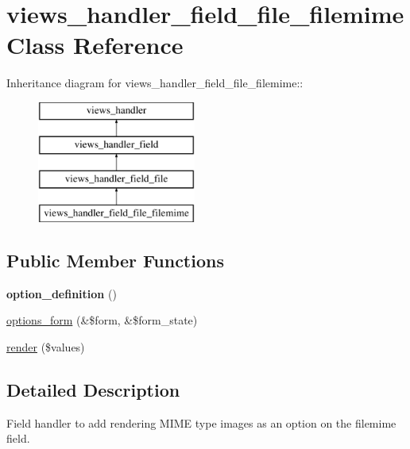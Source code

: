 \hypertarget{classviews__handler__field__file__filemime}{
\section{views\_\-handler\_\-field\_\-file\_\-filemime Class Reference}
\label{classviews__handler__field__file__filemime}
}
Inheritance diagram for views\_\-handler\_\-field\_\-file\_\-filemime::\begin{figure}[H]
\begin{center}
\leavevmode
\includegraphics[height=4cm]{classviews__handler__field__file__filemime}
\end{center}
\end{figure}
\subsection*{Public Member Functions}
\begin{DoxyCompactItemize}
\item 
\hypertarget{classviews__handler__field__file__filemime_ae6e7c1da2de1fdc2f2306578cf56d426}{
{\bfseries option\_\-definition} ()}
\label{classviews__handler__field__file__filemime_ae6e7c1da2de1fdc2f2306578cf56d426}

\item 
\hyperlink{classviews__handler__field__file__filemime_a0ca50231798333edb2dbe1a53d560b8f}{options\_\-form} (\&\$form, \&\$form\_\-state)
\item 
\hyperlink{classviews__handler__field__file__filemime_aab7e80e82c714c09997290dc1b58088e}{render} (\$values)
\end{DoxyCompactItemize}


\subsection{Detailed Description}
Field handler to add rendering MIME type images as an option on the filemime field. 

